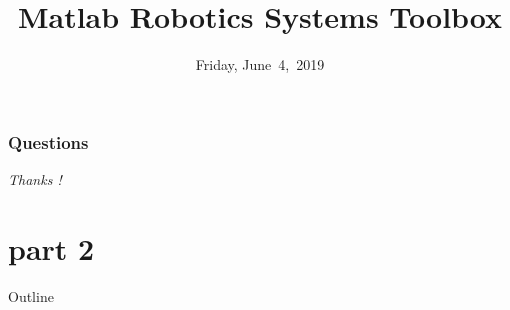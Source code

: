 \documentclass{beamer}
\begin{document}



\section*{Questions}
\begin{frame}{}
  \centering \Huge
  \emph{Thanks !}
\end{frame}
\part{part 2}
\title{Matlab Robotics Systems Toolbox}
\date[June~4,~2019]{Friday, June~4,~2019}
\begin{frame}
\maketitle
\end{frame}
\begin{frame}{Outline}
  \tableofcontents
\end{frame}
\end{document}
